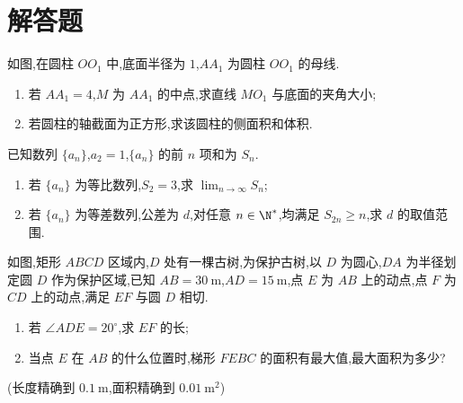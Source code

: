 \section{解答题}

\begin{problem}
如图,在圆柱 \(OO_1\) 中,底面半径为 \(1\),\(AA_1\) 为圆柱 \(OO_1\) 的母线.

\begin{enumerate}
\item 若 \(AA_1=4\),\(M\) 为 \(AA_1\) 的中点,求直线 \(MO_1\) 与底面的夹角大小;
\item 若圆柱的轴截面为正方形,求该圆柱的侧面积和体积.
\end{enumerate}

\end{problem}

\begin{problem}
已知数列 \(\{a_n\}\),\(a_2=1\),\(\{a_n\}\) 的前 \(n\) 项和为 \(S_n\).

\begin{enumerate}
\item 若 \(\{a_n\}\) 为等比数列,\(S_2=3\),求 \(\displaystyle\lim_{n\to\infty}S_n\);
\item 若 \(\{a_n\}\) 为等差数列,公差为 \(d\),对任意 \(n\in\N^*\),均满足 \(S_{2n}\ge n\),求 \(d\) 的取值范围.
\end{enumerate}
\end{problem}

\begin{problem}
如图,矩形 \(ABCD\) 区域内,\(D\) 处有一棵古树,为保护古树,以 \(D\) 为圆心,\(DA\) 为半径划定圆 \(D\) 作为保护区域,已知 \(AB=30\mathrm{~m}\),\(AD=15\mathrm{~m}\),点 \(E\) 为 \(AB\) 上的动点,点 \(F\) 为 \(CD\) 上的动点,满足 \(EF\) 与圆 \(D\) 相切.

\begin{enumerate}
\item 若 \(\angle ADE=20^\circ\),求 \(EF\) 的长;
\item 当点 \(E\) 在 \(AB\) 的什么位置时,梯形 \(FEBC\) 的面积有最大值,最大面积为多少?
\end{enumerate}


(长度精确到 \(0.1\mathrm{~m}\),面积精确到 \(0.01\mathrm{~m}^2\))
\end{problem}

